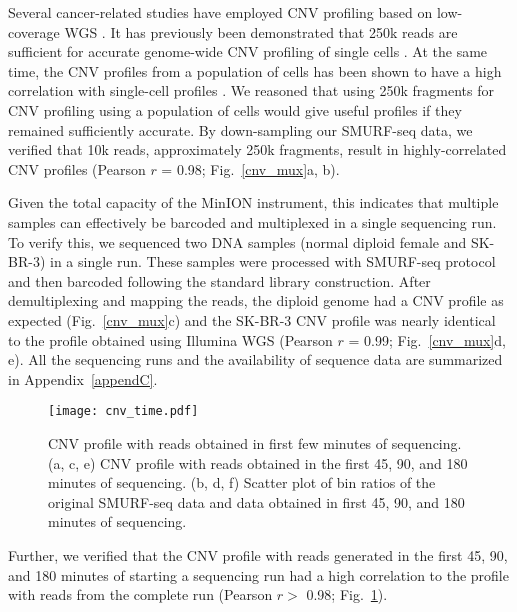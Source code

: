 Several cancer-related studies have employed CNV profiling based on
low-coverage WGS \citep{macintyre2018copy,kader2016copy}.  It has
previously been demonstrated that 250k reads are sufficient for accurate
genome-wide CNV profiling of single cells \citep{baslan2015optimizing}.
At the same time, the CNV profiles from a population of cells has been
shown to have a high correlation with single-cell profiles
\citep{navin2011tumour,baslan2015optimizing}. We reasoned that using 250k
fragments for CNV profiling using a population of cells would give
useful profiles if they remained sufficiently accurate.  By
down-sampling our SMURF-seq data, we verified that 10k reads,
approximately 250k fragments, result in highly-correlated CNV profiles
(Pearson $r$ = 0.98; Fig.~\ref{cnv_mux}a, b).

Given the total capacity of the MinION instrument, this indicates that
multiple samples can effectively be barcoded and multiplexed in a single
sequencing run.
To verify this, we sequenced two DNA samples (normal diploid female and
SK-BR-3) in a single run.  These samples were processed with SMURF-seq
protocol and then barcoded following the standard library construction.
After demultiplexing and mapping the reads, the diploid genome had a CNV
profile as expected (Fig.~\ref{cnv_mux}c) and the SK-BR-3 CNV profile
was nearly identical to the profile obtained using Illumina WGS (Pearson
$r$ = 0.99; Fig.~\ref{cnv_mux}d, e). All the sequencing runs and the
availability of sequence data are summarized in Appendix~\ref{appendC}.

\begin{figure}[t!]
\centering
\texttt{[image: cnv\_time.pdf]}
\caption[CNV profile with reads obtained in first few minutes of
  sequencing]{
  CNV profile with reads obtained in first few minutes of sequencing.
  (a, c, e) CNV profile  with reads obtained in the first 45, 90,
  and 180 minutes of sequencing.
  (b, d, f) Scatter plot of bin ratios of the original
  SMURF-seq data and data obtained in first 45, 90, and 180
  minutes of sequencing.}
  \label{cnv_time}
\end{figure}

Further, we verified that the CNV profile with reads generated in the
first 45, 90, and 180 minutes of starting a sequencing run had a high
correlation to the profile with reads from the complete run (Pearson $r>$
0.98; Fig.~\ref{cnv_time}).

